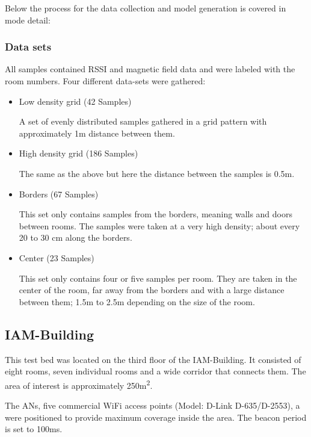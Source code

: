 Below the process for the data collection and model generation is covered in mode detail:

\subsubsection{Data sets}
All samples contained RSSI and magnetic field data and were labeled with the room numbers. Four different data-sets were gathered:
\begin{itemize}
\item Low density grid (42 Samples)

A set of evenly distributed samples gathered in a grid pattern with approximately 1m distance between them.

\item High density grid (186 Samples)

The same as the above but here the distance between the samples is 0.5m.
\item Borders (67 Samples)

This set only contains samples from the borders, meaning walls and doors between rooms. The samples were taken at a very high density; about every 20 to 30 cm along the borders.
\item Center (23 Samples)

This set only contains four or five samples per room. They are taken in the center of the room, far away from the borders and with a large distance between them; 1.5m to 2.5m depending on the size of the room.
\end{itemize}


\subsection{IAM-Building}
This test bed was located on the third floor of the IAM-Building. It consisted of eight rooms, seven individual rooms and a wide corridor that connects them. The area of interest is approximately 250m\textsuperscript{2}.

The ANs, five commercial WiFi access points (Model: D-Link D-635/D-2553), a were positioned to provide maximum coverage inside the area. The beacon period is set to 100ms.




